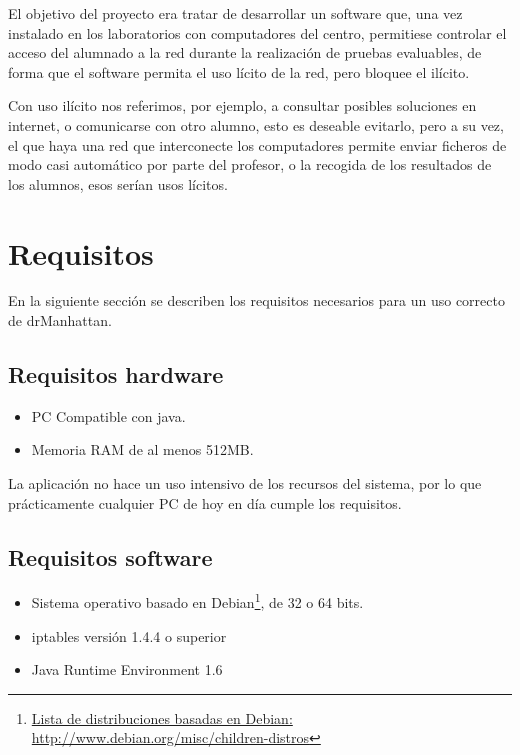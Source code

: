 \documentclass[11pt]{article}
\begin{document}
El objetivo del proyecto era tratar de desarrollar un software que, una vez instalado en los laboratorios con computadores del centro, permitiese controlar el acceso del alumnado a la red durante la realización de pruebas evaluables, de forma que el software permita el uso lícito de la red, pero bloquee el ilícito.

Con uso ilícito nos referimos, por ejemplo, a consultar posibles soluciones en internet, o comunicarse con otro alumno, esto es deseable evitarlo, pero a su vez, el que haya una red que interconecte los computadores permite enviar ficheros de modo casi automático por parte del profesor, o la recogida de los resultados de los alumnos, esos serían usos lícitos.



\newpage

\section{Requisitos}

En la siguiente sección se describen los requisitos necesarios para un uso correcto de drManhattan.

\subsection{Requisitos hardware}

\begin{itemize}

    \item PC Compatible con java.

    \item Memoria RAM de al menos 512MB.

\end{itemize}

La aplicación no hace un uso intensivo de los recursos del sistema, por lo que prácticamente cualquier PC de hoy en día cumple los requisitos.


\subsection{Requisitos software}

\begin{itemize}

    \item Sistema operativo basado en Debian\footnote{\href{http://www.debian.org/misc/children-distros}{Lista de distribuciones basadas en Debian: http://www.debian.org/misc/children-distros}}, de 32 o 64 bits.

    \item iptables versión 1.4.4 o superior

    \item Java Runtime Environment 1.6

\end{itemize}
\end{document}
